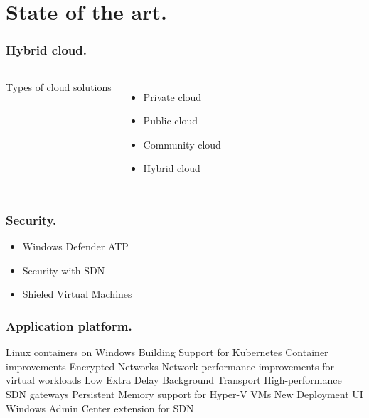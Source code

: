 \documentclass[aspectratio=169]{beamer}
\begin{document}
\section{State of the art.}
\begin{frame}
\frametitle{Hybrid cloud.}  
\begin{columns}[c]
    \colorbox{hgdarkgreen}{Types of cloud solutions}
    \begin{itemize}
       	\itemsep0.4em
        \item Private cloud
        \item Public cloud
        \item Community cloud
        \item Hybrid cloud
    \end{itemize}

    
\end{columns}
\end{frame}
\begin{frame}
\frametitle{Security.}  
\vspace*{\fill}
    \begin{itemize}
    	\itemsep0.4em
        \item[] \colorbox{hgorange}{Windows Defender ATP}
        \item[] \colorbox{hgblue}{Security with SDN}
        \item[] \colorbox{hglightgreen}{Shieled Virtual Machines}
    \end{itemize}
\vspace*{\fill}

\end{frame}
\begin{frame}
\frametitle{Application platform.}
    \vspace*{\fill}
    \colorbox{hgdarkgreen}{Linux containers on Windows}
    \colorbox{hgpink}{Building Support for Kubernetes}
    \colorbox{hgochre}{Container improvements}
    \colorbox{hgorange}{Encrypted Networks}
    \colorbox{hgpurple}{Network performance improvements for virtual workloads}
    \colorbox{hgblue}{Low Extra Delay Background Transport}
    \colorbox{hglightgreen}{High-performance SDN gateways}
    \colorbox{hgbrown}{Persistent Memory support for Hyper-V VMs}
    \colorbox{hggrey}{New Deployment UI}
    \colorbox{hgyellow}{Windows Admin Center extension for SDN}
    \vspace*{\fill}
\end{frame}
\end{document}

